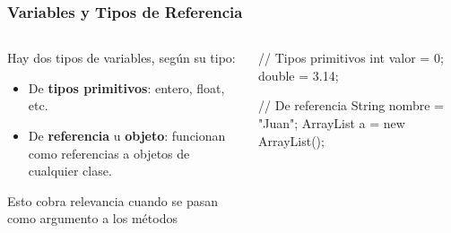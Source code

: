 \documentclass{beamer}
\begin{document}
\begin{frame}[fragile]
  \frametitle{Variables y Tipos de Referencia}

  \begin{columns}
    \begin{column}{0.4\textwidth}      
      Hay dos tipos de variables, según su tipo:
      \begin{itemize}
      \item De \textbf{tipos primitivos}: entero, float, etc.        
      \item De \textbf{referencia} u \textbf{objeto}: funcionan como
        referencias a objetos de cualquier clase.        
      \end{itemize}
      Esto cobra relevancia cuando se pasan como argumento a los métodos
    \end{column}
    \begin{column}{0.6\textwidth}      
      \begin{jsmall}
        // Tipos primitivos
        int valor = 0;
        double = 3.14;

        // De referencia
        String nombre = "Juan";
        ArrayList a = new ArrayList();
      \end{jsmall}
    \end{column}
  \end{columns}  
\end{frame}  
\end{document}

